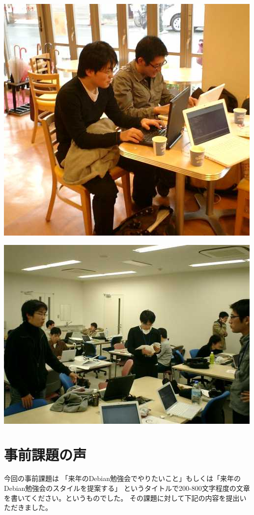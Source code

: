 \documentclass[cjk,dvipdfmx]{beamer}
\begin{document}
\begin{frame}
 \includegraphics[width=0.8\hsize]{image200611/hack.jpg}
\end{frame}

\begin{frame}
 \includegraphics[width=0.8\hsize]{image200612/kansai.jpg}
\end{frame}


\section{事前課題の声}
\begin{frame}

 今回の事前課題は
 「来年のDebian勉強会でやりたいこと」もしくは「来年の
 Debian勉強会のスタイルを提案する」
 というタイトルで200-800文字程度の文章を書いてください。というものでした。
 その課題に対して下記の内容を提出いただきました。
\end{frame}
\end{document}
